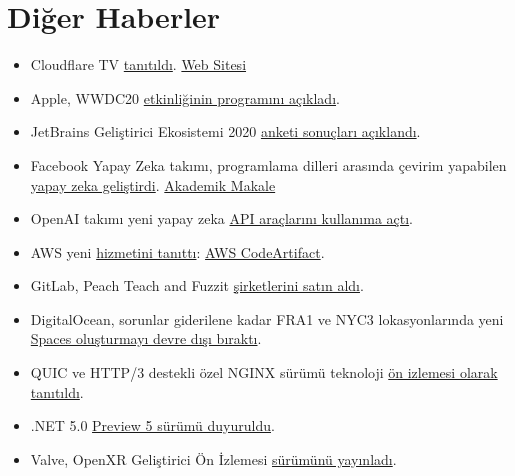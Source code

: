 \documentclass[11pt]{article}
\begin{document}
\section{Diğer Haberler}
\label{sec:orgf1fc003}
\begin{itemize}
\item Cloudflare TV \href{https://blog.cloudflare.com/ladies-and-gentlemen-cloudflare-tv/}{tanıtıldı}. \href{https://cloudflare.tv/live}{Web Sitesi}
\item Apple, WWDC20 \href{https://www.apple.com/newsroom/2020/06/apple-reveals-lineup-for-its-biggest-ever-worldwide-developers-conference/}{etkinliğinin programını açıkladı}.
\item JetBrains Geliştirici Ekosistemi 2020 \href{https://www.jetbrains.com/lp/devecosystem-2020}{anketi sonuçları açıklandı}.
\item Facebook Yapay Zeka takımı, programlama dilleri arasında çevirim yapabilen
\href{https://towardsdatascience.com/facebooks-transcoder-an-ai-source-to-source-compiler-23ea77f3234b}{yapay zeka geliştirdi}. \href{https://arxiv.org/abs/2006.03511}{Akademik Makale}
\item OpenAI takımı yeni yapay zeka \href{https://openai.com/blog/openai-api/}{API araçlarını kullanıma açtı}.
\item AWS yeni \href{https://aws.amazon.com/about-aws/whats-new/2020/06/introducing-aws-codeartifact-a-fully-managed-software-artifact-repository-service/}{hizmetini tanıttı}: \href{https://aws.amazon.com/about-aws/whats-new/2020/06/introducing-aws-codeartifact-a-fully-managed-software-artifact-repository-service/}{AWS CodeArtifact}.
\item GitLab, Peach Teach and Fuzzit \href{https://about.gitlab.com/press/releases/2020-06-11-gitlab-acquires-peach-tech-and-fuzzit-to-expand-devsecops-offering.html}{şirketlerini satın aldı}.
\item DigitalOcean, sorunlar giderilene kadar FRA1 ve NYC3 lokasyonlarında yeni
\href{https://www.digitalocean.com/docs/release-notes/upcoming/spaces-fra1-nyc3/}{Spaces oluşturmayı devre dışı bıraktı}.
\item QUIC ve HTTP/3 destekli özel NGINX sürümü teknoloji \href{https://www.nginx.com/blog/introducing-technology-preview-nginx-support-for-quic-http-3/}{ön izlemesi olarak
tanıtıldı}.
\item .NET 5.0 \href{https://devblogs.microsoft.com/dotnet/announcing-net-5-0-preview-5/}{Preview 5 sürümü duyuruldu}.
\item Valve, OpenXR Geliştirici Ön İzlemesi \href{https://uploadvr.com/valve-openxr-steamvr-beta}{sürümünü yayınladı}.

\end{itemize}
\end{document}
